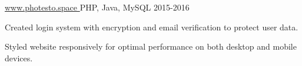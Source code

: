 \begin{cventries}
  {\href{www.photesto.space}{www.photesto.space \faExternalLink}} {PHP, Java,
    MySQL} {2015-2016} {
    \begin{cvitems}
    \item Created login system with encryption and email verification to protect
      user data.
    \item Styled website responsively for optimal performance on both desktop
      and mobile devices.
    \end{cvitems}
  }
  
\end{cventries}
